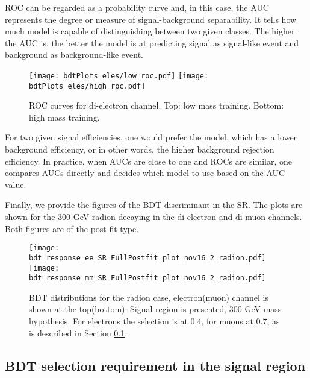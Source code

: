 ROC can be regarded as a probability curve and, in this case, the AUC represents the degree or measure of signal-background separability. It tells how much model is capable of distinguishing between two given classes. The higher the AUC is, the better the model is at predicting signal as signal-like event and background as background-like event.

\begin{figure}[H]
  \begin{center}
   \texttt{[image: bdtPlots\_eles/low\_roc.pdf]}
   \texttt{[image: bdtPlots\_eles/high\_roc.pdf]}
    \caption[ROC curves for di-electron channel.]{ ROC curves for di-electron channel. Top: low mass training. Bottom: high mass training. }
    \label{fig:ele_ROCs}
  \end{center}
\end{figure}

For two given signal efficiencies, one would prefer the model, which has a lower background efficiency, or in other words, the higher background rejection efficiency. In practice, when AUCs are close to one and ROCs are similar, one compares AUCs directly and decides which model to use based on the AUC value. 

Finally, we provide the figures of the BDT discriminant in the SR. The plots are shown for the 300 GeV radion decaying in the di-electron and di-muon channels. Both figures are of the post-fit type.

\begin{figure}[H]
  \begin{center}
   \texttt{[image: bdt\_response\_ee\_SR\_FullPostfit\_plot\_nov16\_2\_radion.pdf]}\\
   \texttt{[image: bdt\_response\_mm\_SR\_FullPostfit\_plot\_nov16\_2\_radion.pdf]}\\
    \caption[BDT distributions for the radion case.]{ BDT distributions for the radion case, electron(muon) channel is shown at the top(bottom). Signal region is presented, 300 GeV mass hypothesis. For electrons the selection is at 0.4, for muons at 0.7, as is described in Section \ref{BDT_selection_in_SR}.}
    \label{fig:BDTs}
  \end{center}
\end{figure}

\subsection{BDT selection requirement in the signal region}
\label{BDT_selection_in_SR}

